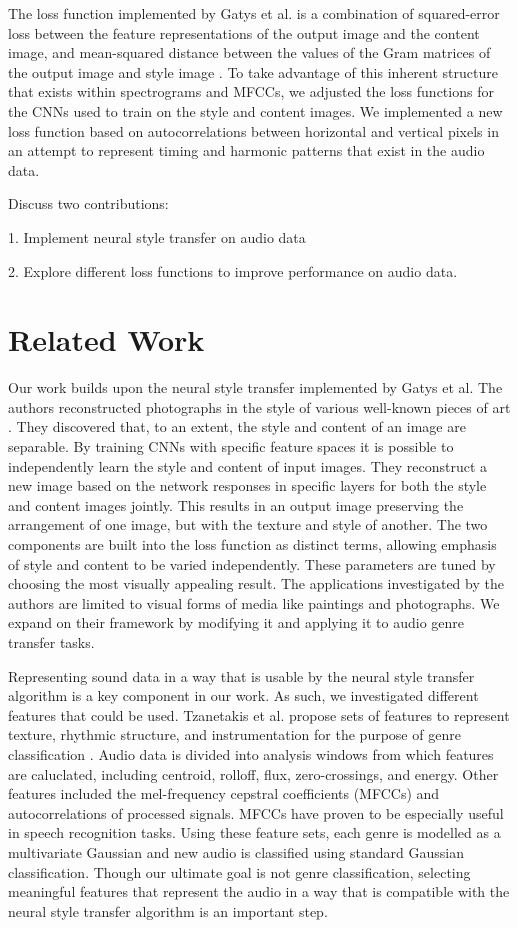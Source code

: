 \documentclass{article}
\begin{document}
The loss function implemented by Gatys et al. is a combination of squared-error loss between the feature representations of the output image and the content image, and mean-squared distance between the values of the Gram matrices of the output image and style image \citep{Gatys2015}. To take advantage of this inherent structure that exists within spectrograms and MFCCs, we adjusted the loss functions for the CNNs used to train on the style and content images. We implemented a new loss function based on autocorrelations between horizontal and vertical pixels in an attempt to represent timing and harmonic patterns that exist in the audio data.

Discuss two contributions:

1. Implement neural style transfer on audio data

2. Explore different loss functions to improve performance on audio data.


\section{Related Work}

Our work builds upon the neural style transfer implemented by Gatys et al. The authors reconstructed photographs in the style of various well-known pieces of art \citep{Gatys2015}. They discovered that, to an extent, the style and content of an image are separable. By training CNNs with specific feature spaces it is possible to independently learn the style and content of input images. They reconstruct a new image based on the network responses in specific layers for both the style and content images jointly. This results in an output image preserving the arrangement of one image, but with the texture and style of another. The two components are built into the loss function as distinct terms, allowing emphasis of style and content to be varied independently. These parameters are tuned by choosing the most visually appealing result. The applications investigated by the authors are limited to visual forms of media like paintings and photographs. We expand on their framework by modifying it and applying it to audio genre transfer tasks.

Representing sound data in a way that is usable by the neural style transfer algorithm is a key component in our work. As such, we investigated different features that could be used. Tzanetakis et al. propose sets of features to represent texture, rhythmic structure, and instrumentation for the purpose of genre classification \citep{Tzanetakis2001}. Audio data is divided into analysis windows from which features are caluclated, including centroid, rolloff, flux, zero-crossings, and energy. Other features included the mel-frequency cepstral coefficients (MFCCs) and autocorrelations of processed signals. MFCCs have proven to be especially useful in speech recognition tasks. Using these feature sets, each genre is modelled as a multivariate Gaussian and new audio is classified using standard Gaussian classification. Though our ultimate goal is not genre classification, selecting meaningful features that represent the audio in a way that is compatible with the neural style transfer algorithm is an important step.
\end{document}
